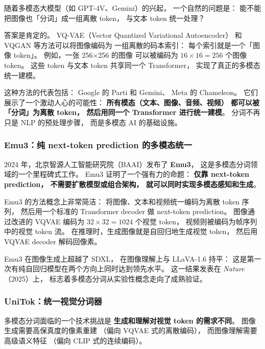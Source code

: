 随着多模态大模型（如 GPT-4V、Gemini）的兴起，
一个自然的问题是：
能不能把图像也「分词」成一组离散 token，
与文本 token 统一处理？

答案是肯定的。
VQ-VAE（Vector Quantized Variational Autoencoder）
和 VQGAN 等方法可以将图像编码为
一组离散的码本索引：
每个索引就是一个「图像 token」。
例如，一张 256$\times$256 的图像
可以被编码为 $16 \times 16 = 256$ 个图像 token。
这些 token 与文本 token 共享同一个 Transformer，
实现了真正的多模态统一建模。

这种方法的代表包括：
Google 的 Parti 和 Gemini、
Meta 的 Chameleon。
它们展示了一个激动人心的可能性：
\textbf{所有模态（文本、图像、音频、视频）
都可以被「分词」为离散 token，
然后用同一个 Transformer 进行统一建模}。
分词不再只是 NLP 的预处理步骤，
而是多模态 AI 的基础设施。

\subsubsection{Emu3：纯 next-token prediction 的多模态统一}

2024 年，北京智源人工智能研究院（BAAI）发布了 \textbf{Emu3}，
这是多模态分词领域的一个里程碑式工作。
Emu3 证明了一个强有力的命题：
\textbf{仅靠 next-token prediction，
不需要扩散模型或组合架构，
就可以同时实现多模态感知和生成}。

Emu3 的方法概念上非常简洁：
将图像、文本和视频统一编码为离散 token 序列，
然后用一个标准的 Transformer decoder 做 next-token prediction。
图像通过改进的 VQVAE 编码为 $32 \times 32 = 1024$ 个视觉 token，
视频则被编码为帧序列中的视觉 token 流。
在推理时，生成图像就是自回归地生成视觉 token，
然后用 VQVAE decoder 解码回像素。

Emu3 在图像生成上超越了 SDXL，
在图像理解上与 LLaVA-1.6 持平：
这是第一次有纯自回归模型在两个方向上同时达到领先水平。
这一结果发表在 \textit{Nature}（2025）上，
标志着多模态分词从实验性概念走向了成熟验证。

\subsubsection{UniTok：统一视觉分词器}

多模态分词面临的一个技术挑战是
\textbf{生成和理解对视觉 token 的需求不同}。
图像生成需要高保真度的像素重建
（偏向 VQVAE 式的离散编码），
而图像理解需要高级语义特征
（偏向 CLIP 式的连续编码）。


